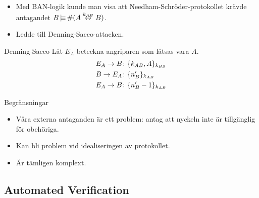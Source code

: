 \begin{frame}
  \begin{itemize}
    \item Med BAN-logik kunde man visa att Needham-Schröder-protokollet krävde 
      antagandet \(B\operatorname{|\!\!\!\equiv} \#(A\stackrel{k_{AB}}{\leftrightarrow} B)\).
    \item Ledde till Denning-Sacco-attacken.
  \end{itemize}
  \begin{block}{Denning-Sacco}
    Låt \(E_A\) beteckna angriparen som låtsas vara \(A\).
    \begin{align*}
      E_A\to B &\colon \{k_{AB}, A\}_{k_{BS}} \\
      B\to E_A &\colon \{n_B^\prime\}_{k_{AB}} \\
      E_A\to B &\colon \{n_B^\prime-1\}_{k_{AB}}
    \end{align*}
  \end{block}
\end{frame}

\begin{frame}
  \begin{alertblock}{Begränsningar}
    \begin{itemize}
      \item Våra externa antaganden är ett problem: antag att nyckeln inte är 
        tillgänglig för obehöriga.

      \item Kan bli problem vid idealiseringen av protokollet.

      \item Är tämligen komplext.

    \end{itemize}
  \end{alertblock}
\end{frame}

\subsection{Automated Verification}

